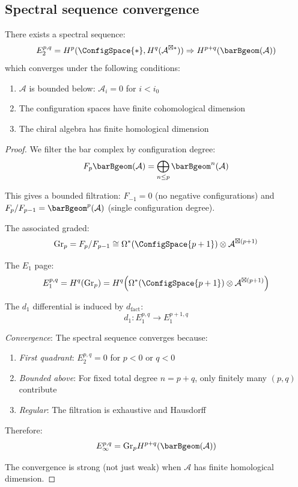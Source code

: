 \subsection{Spectral sequence convergence}

\begin{theorem}
\label{thm:bar-complex-spectral-sequence}
There exists a spectral sequence:
\[E_2^{p,q} = H^p(\ConfigSpace{*}, H^q(\mathcal{A}^{\boxtimes *})) \Rightarrow H^{p+q}(\barBgeom(\mathcal{A}))\]
which converges under the following conditions:
\begin{enumerate}
\item $\mathcal{A}$ is bounded below: $\mathcal{A}_i = 0$ for $i < i_0$
\item The configuration spaces have finite cohomological dimension
\item The chiral algebra has finite homological dimension
\end{enumerate}
\end{theorem}

\begin{proof}
We filter the bar complex by configuration degree:
\[F_p\barBgeom(\mathcal{A}) = \bigoplus_{n \leq p} \barBgeom^n(\mathcal{A})\]

This gives a bounded filtration: $F_{-1} = 0$ (no negative configurations) and $F_p/F_{p-1} = \barBgeom^p(\mathcal{A})$ (single configuration degree).

The associated graded:
\[\text{Gr}_p = F_p/F_{p-1} \cong \Omega^*(\ConfigSpace{p+1}) \otimes \mathcal{A}^{\boxtimes(p+1)}\]

The $E_1$ page:
\[E_1^{p,q} = H^q(\text{Gr}_p) = H^q\!\left(\Omega^*(\ConfigSpace{p+1}) \otimes \mathcal{A}^{\boxtimes(p+1)}\right)\]

The $d_1$ differential is induced by $d_{\text{fact}}$:
\[d_1: E_1^{p,q} \to E_1^{p+1,q}\]

\emph{Convergence}: The spectral sequence converges because:
\begin{enumerate}
\item \emph{First quadrant}: $E_2^{p,q} = 0$ for $p < 0$ or $q < 0$
\item \emph{Bounded above}: For fixed total degree $n = p + q$, only finitely many $(p,q)$ contribute
\item \emph{Regular}: The filtration is exhaustive and Hausdorff
\end{enumerate}

Therefore:
\[E_\infty^{p,q} = \text{Gr}_p H^{p+q}(\barBgeom(\mathcal{A}))\]

The convergence is strong (not just weak) when $\mathcal{A}$ has finite homological dimension.
\end{proof}

